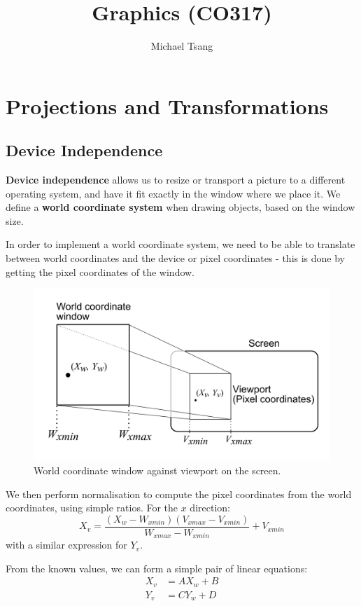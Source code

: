 \documentclass[11pt]{article}
\title{Graphics (CO317)}
\author{Michael Tsang}
\begin{document}
\maketitle

\section{Projections and Transformations}
\subsection{Device Independence}
\textbf{Device independence} allows us to resize or transport a picture to a different operating system, and have it fit exactly in the window where we place it.
We define a \textbf{world coordinate system} when drawing objects, based on the window size.

In order to implement a world coordinate system, we need to be able to translate between world coordinates and the device or pixel coordinates - this is done by getting the pixel coordinates of the window.

\begin{figure}[htb!]
  \caption{World coordinate window against viewport on the screen.}
  \includegraphics[scale=0.2]{normalisation}
  \centering
\end{figure}

We then perform normalisation to compute the pixel coordinates from the world coordinates, using simple ratios.
For the $x$ direction:
\[
  X_v = \frac{(X_w - W_{xmin})(V_{xmax} - V_{xmin})}{W_{xmax} - W_{xmin}} + V_{xmin}
\]
with a similar expression for $Y_v$.

From the known values, we can form a simple pair of linear equations:
\begin{align*}
  X_v &= AX_w + B \\
  Y_v &= CY_w + D
\end{align*}
\end{document}

